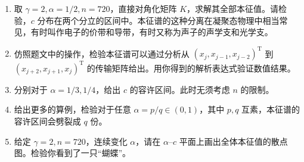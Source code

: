 \begin{enumerate}
下面，我们来给这个链条加上一些别的约束。给每个振子额外再绑上一根弹簧（见图 3.8），这些额外弹簧的劲度系数呈周期变化。此时，系统的运动方程变为
\begin{equation}
m\ddot x_j=\kappa(x_{j+1}-x_j)+\kappa(x_{j-1}-x_j)-[g_0+g_1\cos(2\pi j\alpha)]x_j,
\qquad j=1,2,\ldots,n.
\tag{13}
\end{equation}
容易检验，此时系统的本征值方程为
\begin{equation}
x_{j+1}=\left[2-\lambda+\frac{g_0+g_1\cos(2\pi j\alpha)}{\kappa}\right]x_j-x_{j-1}.
\tag{14}
\end{equation}
记 $c=(2-\lambda+g_0/\kappa)$，$\gamma=g_1/\kappa$，请求解以下问题：

\begin{figure}[htbp]
\centering
{}
\caption{有约束的弹簧振子链}
\label{fig:constrained-spring-chain}
\end{figure}

\item 取 $\gamma=2,\alpha=1/2,n=720$，直接对角化矩阵 $K$，求解其全部本征值。请检验，$c$ 分布在两个分立的区间中。本征谱的这种分离在凝聚态物理中相当常见，有时叫作电子的价带和导带，有时又称为声子的声学支和光学支。
\item 仿照题文中的操作，检验本征谱可以通过分析从 $(x_j,x_{j-1},x_{j-2})^{\mathrm T}$ 到 $(x_{j+2},x_{j+1},x_j)^{\mathrm T}$ 的传输矩阵给出。用你得到的解析表达式验证数值结果。
\item 分别对于 $\alpha=1/3,1/4$，给出 $c$ 的容许区间。此时无须考虑 $n$ 的限制。
\item 给出更多的算例，检验对于任意 $\alpha=p/q\in(0,1)$，其中 $p,q$ 互素，本征谱的容许区间会劈裂成 $q$ 份。
\item 给定 $\gamma=2,n=720$，连续变化 $\alpha$，请在 $\alpha$--$c$ 平面上画出全体本征值的散点图。检验你看到了一只“蝴蝶”。
\end{enumerate}

